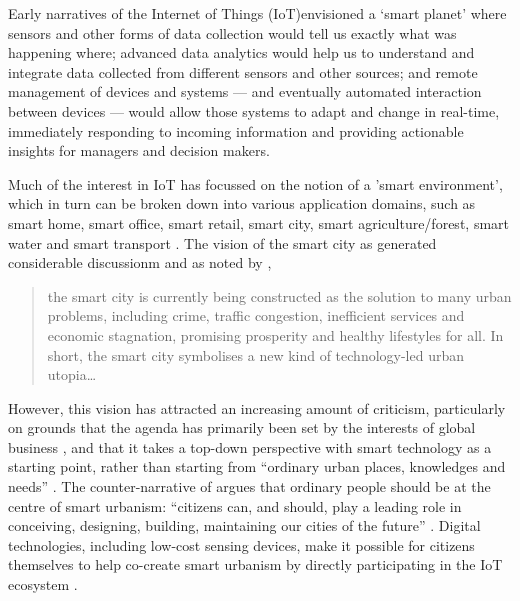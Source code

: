 Early narratives of the Internet of Things (IoT)envisioned a ‘smart planet’
where sensors and other forms of data
collection would tell us exactly what was happening where;
advanced data analytics would help us to understand and integrate data
collected from different sensors and other sources; and remote
management of devices and systems --- and eventually automated
interaction between devices --- would allow those systems to adapt and
change in real-time, immediately responding to incoming information
and providing actionable insights for managers and decision makers.  

Much of the interest in IoT has focussed on the notion of a 'smart
environment', which in turn can be broken down into various
application domains, such as smart home, smart office, smart retail,
smart city, smart agriculture/forest, smart water and smart transport \cite{Gubbi-2013-IOT}.
The vision of the smart city as generated considerable discussionm and
as noted by \cite{Hollands-2015-CIIT}, 

\begin{quote}
  the smart city is currently being constructed as the solution to
  many urban problems, including crime, traffic congestion, inefficient
  services and economic stagnation, promising prosperity and healthy
  lifestyles for all. In short, the smart city symbolises a new kind
  of technology-led urban utopia\ldots
\end{quote}

However, this vision has attracted an increasing amount of criticism,
particularly on grounds that the agenda has primarily been set by the
interests of global business \cite{Hollands-2015-CIIT}, and that it
takes a top-down perspective with smart technology as a starting
point, rather than starting from ``ordinary urban places, knowledges
and needs'' \cite{Mcfarlane-2017-OASC}. The counter-narrative of
 argues that ordinary people should be at the
centre of smart urbanism: ``citizens can, and should, play a leading
role in conceiving, designing, building, maintaining our cities of the
future'' \cite{Hemment-2013-SC,Hemment-2016-HTDU}.
Digital technologies, including low-cost sensing devices, make it
possible for citizens themselves to help co-create smart urbanism by
directly participating in the IoT ecosystem \cite{Balestrini-2017-OCTT}.





